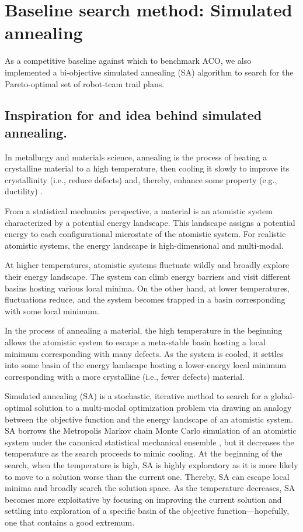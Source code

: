 \documentclass[fleqn,10pt,lineno]{wlpeerj}
\begin{document}
\section{Baseline search method: Simulated annealing}
As a competitive baseline against which to benchmark ACO, we also implemented a bi-objective simulated annealing (SA) algorithm \cite{kirkpatrick1983optimization,simon2013evolutionary,zomaya2010simulated} to search for the Pareto-optimal set of robot-team trail plans.

\subsection{Inspiration for and idea behind simulated annealing.}
In metallurgy and materials science, annealing is the process of heating a crystalline material to a high temperature, then cooling it slowly to improve its crystallinity (i.e., reduce defects) and, thereby, enhance some property (e.g., ductility) \cite{callister2020materials}.

From a statistical mechanics \cite{chandler1987introduction} perspective, a material is an atomistic system characterized by a potential energy landscape. This landscape assigns a potential energy to each configurational microstate of the atomistic system. For realistic atomistic systems, the energy landscape is high-dimensional and multi-modal.

At higher temperatures, atomistic systems fluctuate wildly and broadly explore their energy landscape. The system can climb energy barriers and visit different basins hosting various local minima.
On the other hand, at lower temperatures, fluctuations reduce, and the system becomes trapped in a basin corresponding with some local minimum.

In the process of annealing a material, the high temperature in the beginning allows the atomistic system to escape a meta-stable basin hosting a local minimum corresponding with many defects. 
As the system is cooled, it settles into some basin of the energy landscape hosting a lower-energy local minimum corresponding with a more crystalline (i.e., fewer defects) material.
  
Simulated annealing (SA) \cite{kirkpatrick1983optimization,simon2013evolutionary,zomaya2010simulated} is a stochastic, iterative method to search for a global-optimal solution to a multi-modal optimization problem via drawing an analogy between the objective function and the energy landscape of an atomistic system. 
  SA borrows the Metropolis Markov chain Monte Carlo simulation of an atomistic system under the canonical statistical mechanical ensemble \cite{frenkel2023understanding}, but it decreases the temperature as the search proceeds to mimic cooling. 
   At the beginning of the search, when the temperature is high, SA is highly exploratory as it is more likely to move to a solution worse than the current one.
   Thereby, SA can escape local minima and broadly search the solution space.
  As the temperature decreases, SA becomes more exploitative by focusing on improving the current solution and settling into exploration of a specific basin of the objective function---hopefully, one that contains a good extremum. 
 
\end{document}
